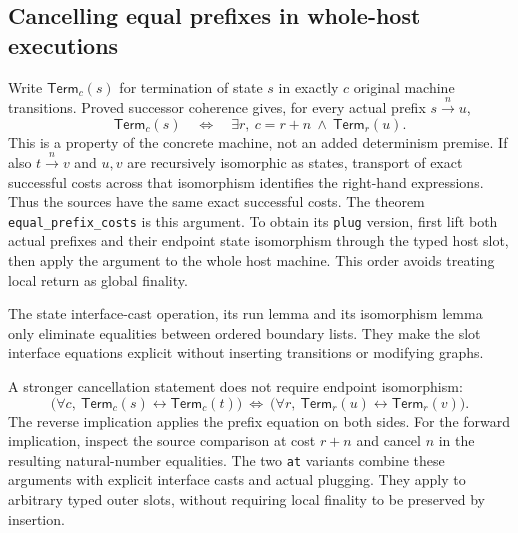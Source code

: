 \subsection{Cancelling equal prefixes in whole-host executions}
Write $\mathsf{Term}_c(s)$ for termination of state $s$ in exactly $c$ original
machine transitions. Proved successor coherence gives, for every actual prefix
$s\xrightarrow{n}u$,
\[
 \mathsf{Term}_c(s)\quad\Longleftrightarrow\quad
 \exists r,\ c=r+n\ \land\ \mathsf{Term}_r(u).
\]
This is a property of the concrete machine, not an added determinism premise.
If also $t\xrightarrow{n}v$ and $u,v$ are recursively isomorphic as states,
transport of exact successful costs across that isomorphism identifies the
right-hand expressions. Thus the sources have the same exact successful costs.
The theorem \texttt{equal\_prefix\_costs} is this argument. To obtain its
\texttt{plug} version, first lift both actual prefixes and their endpoint state
isomorphism through the typed host slot, then apply the argument to the whole
host machine. This order avoids treating local return as global finality.

The state interface-cast operation, its run lemma and its isomorphism lemma
only eliminate equalities between ordered boundary lists. They make the slot
interface equations explicit without inserting transitions or modifying graphs.


A stronger cancellation statement does not require endpoint isomorphism:
\[
 \bigl(\forall c,\ \mathsf{Term}_c(s)\leftrightarrow\mathsf{Term}_c(t)\bigr)
 \ \Longleftrightarrow\
 \bigl(\forall r,\ \mathsf{Term}_r(u)\leftrightarrow\mathsf{Term}_r(v)\bigr).
\]
The reverse implication applies the prefix equation on both sides. For the
forward implication, inspect the source comparison at cost $r+n$ and cancel
$n$ in the resulting natural-number equalities. The two \texttt{at} variants
combine these arguments with explicit interface casts and actual plugging.
They apply to arbitrary typed outer slots, without requiring local finality to
be preserved by insertion.

